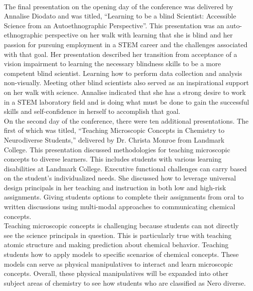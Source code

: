 \documentclass[11pt]{sig-alternate}
\begin{document}
\vspace{2.5 mm}\\The final presentation on the opening day of the conference was delivered by Annalise Diodato and was titled, “Learning to be a blind Scientist: Accessible Science from an Autoethnographic Perspective”. This presentation was an auto-ethnographic perspective on her walk with learning that she is blind and her passion for pursuing employment in a STEM career and the challenges associated with that goal. Her presentation described her transition from acceptance of a vision impairment to learning the necessary blindness skills to be a more competent blind scientist. Learning how to perform data collection and analysis non-visually. Meeting other blind scientists also served as an inspirational support on her walk with science. Annalise indicated that she has a strong desire to work in a STEM laboratory field and is doing what must be done to gain the successful skills and self-confidence in herself to accomplish that goal.
\vspace{2.5 mm}\\On the second day of the conference, there were ten additional presentations. The first of which was titled, “Teaching Microscopic Concepts in Chemistry to Neurodiverse Students,” delivered by Dr. Christa Monroe from Landmark College. This presentation discussed methodologies for teaching microscopic concepts to diverse learners. This includes students with various learning disabilities at Landmark College. Executive functional challenges can carry based on the student’s individualized needs. She discussed how to leverage universal design principals in her teaching and instruction in both low and high-risk assignments. Giving students options to complete their assignments from oral to written discussions using multi-modal approaches to communicating chemical concepts.
\vspace{2.5 mm}\\Teaching microscopic concepts is challenging because students can not directly see the science principals in question. This is particularly true with teaching atomic structure and making prediction about chemical behavior. Teaching students how to apply models to specific scenarios of chemical concepts. These models can serve as physical manipulatives to interact and learn microscopic concepts. Overall, these physical manipulatives will be expanded into other subject areas of chemistry to see how students who are classified as Nero diverse.
\end{document}
